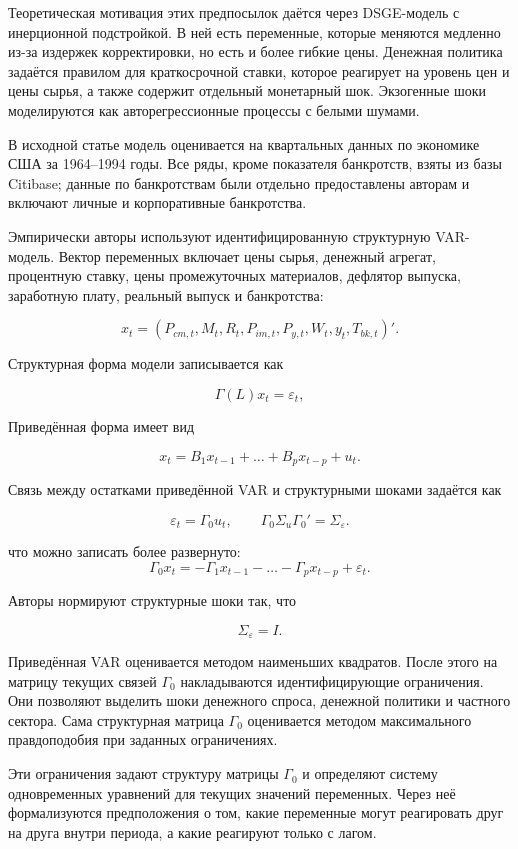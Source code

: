 Теоретическая мотивация этих предпосылок даётся через DSGE-модель с инерционной подстройкой. В ней есть переменные, которые меняются медленно из-за издержек корректировки, но есть и более гибкие цены. Денежная политика задаётся правилом для краткосрочной ставки, которое реагирует на уровень цен и цены сырья, а также содержит отдельный монетарный шок. Экзогенные шоки моделируются как авторегрессионные процессы с белыми шумами.

В исходной статье модель оценивается на квартальных данных по экономике США за 1964--1994 годы. Все ряды, кроме показателя банкротств, взяты из базы Citibase; данные по банкротствам были отдельно предоставлены авторам и включают личные и корпоративные банкротства.

Эмпирически авторы используют идентифицированную структурную VAR-модель. Вектор переменных включает цены сырья, денежный агрегат, процентную ставку, цены промежуточных материалов, дефлятор выпуска, заработную плату, реальный выпуск и банкротства:


$$
x_t =
(P_{cm,t}, M_t, R_t, P_{im,t}, P_{y,t}, W_t, y_t, T_{bk,t})'.
$$

Структурная форма модели записывается как

$$
\Gamma(L)x_t=\varepsilon_t,
$$

Приведённая форма имеет вид

$$
x_t =
B_1 x_{t-1}
+\dots+
B_p x_{t-p}
+
u_t.
$$

Связь между остатками приведённой VAR и структурными шоками задаётся как

$$
\varepsilon_t=\Gamma_0u_t,
\qquad
\Gamma_0\Sigma_u\Gamma_0'=\Sigma_\varepsilon.
$$

что можно записать более развернуто:
$$
\Gamma_0 x_t
=
-\Gamma_1 x_{t-1}
-\dots
-\Gamma_p x_{t-p}
+
\varepsilon_t.
$$

Авторы нормируют структурные шоки так, что

$$
\Sigma_\varepsilon=I.
$$

Приведённая VAR оценивается методом наименьших квадратов. После этого на матрицу текущих связей $\Gamma_0$ накладываются идентифицирующие ограничения. Они позволяют выделить шоки денежного спроса, денежной политики и частного сектора. Сама структурная матрица $\Gamma_0$ оценивается методом максимального правдоподобия при заданных ограничениях.

Эти ограничения задают структуру матрицы $\Gamma_0$ и определяют систему одновременных уравнений для текущих значений переменных. Через неё формализуются предположения о том, какие переменные могут реагировать друг на друга внутри периода, а какие реагируют только с лагом.

